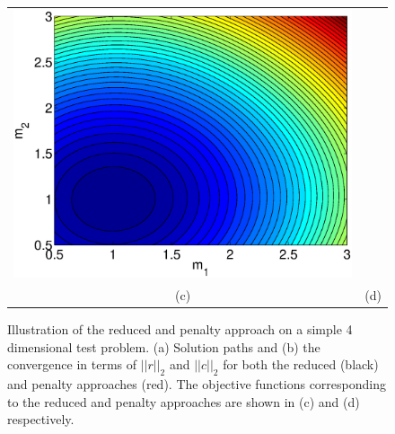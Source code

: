 \documentclass{iopart}
\begin{document}
\begin{figure}
\begin{tabular}{cc}
\includegraphics[scale=.4]{./figs/opt_e}\\
{\small (c)}&{\small (d)}\\
\end{tabular}
\caption{Illustration of the reduced and penalty approach on a simple 4 dimensional test problem. (a) Solution paths and (b) the convergence in terms of $||r||_2$ and $||c||_2$ for both the reduced (black) and penalty approaches (red). The objective functions corresponding to the reduced and penalty approaches are shown in (c) and (d) respectively.}
\label{fig:opt}
\end{figure}



\clearpage


\end{document}

